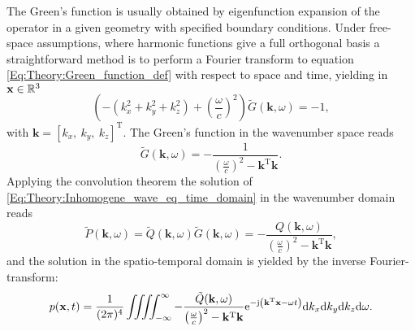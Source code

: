 The Green's function is usually obtained by eigenfunction expansion of the operator in a given geometry with specified boundary conditions. Under free-space assumptions, where harmonic functions give a full orthogonal basis a straightforward method is to perform a Fourier transform to equation \eqref{Eq:Theory:Green_function_def} with respect to space and time, yielding in $\mathbf{x} \in \mathbb{R}^{3}$
\begin{equation}
(-(k_x^2 + k_y^2 + k_z^2) + \left(\frac{\omega}{c} \right)^2)\tilde{G}(\mathbf{k},\omega) = -1,
\end{equation}
with $\mathbf{k} = [k_x,\ k_y,\ k_z]^{\mathrm{T}}$.
The Green's function in the wavenumber space reads \cite{Devaney2012, Watanabe2015}
\begin{equation}
\tilde{G}(\mathbf{k},\omega) = -\frac{1}{\left( \frac{\omega}{c}\right)^2 - \mathbf{k}^{\mathrm{T}} \mathbf{k}}.
\label{Eq:Theory:3D_kxkykzw_Green}
\end{equation}
Applying the convolution theorem the solution of \eqref{Eq:Theory:Inhomogene_wave_eq_time_domain} in the wavenumber domain reads
\begin{equation}
\tilde{P}(\mathbf{k},\omega)  = \tilde{Q}(\mathbf{k},\omega) \tilde{G}(\mathbf{k},\omega) = -\frac{Q	(\mathbf{k},\omega)}{\left( \frac{\omega}{c}\right)^2 -  \mathbf{k}^{\mathrm{T}} \mathbf{k} },
\end{equation}
and the solution in the spatio-temporal domain is yielded by the inverse Fourier-transform:
\begin{equation}
p(\mathbf{x},t) =\frac{1}{(2\pi)^4} \iiiint^{\infty}_{-\infty} - \frac{\tilde{Q}(\mathbf{k},\omega)}{\left( \frac{\omega}{c}\right)^2 -  \mathbf{k}^{\mathrm{T}} \mathbf{k} } \mathrm{e}^{-\mathrm{j} \left( \mathbf{k}^{\mathrm{T}}\mathbf{x} - \omega t \right) } \mathrm{d} k_x \mathrm{d} k_y \mathrm{d} k_z \mathrm{d} \omega.
\end{equation}


